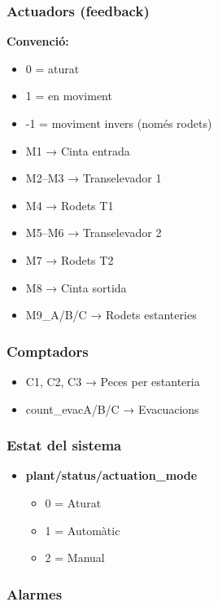 \documentclass[12pt,a4paper]{report}
\begin{document}
\subsubsection{Actuadors (feedback)}

\textbf{Convenció:}
\begin{itemize}
\item 0 = aturat
\item 1 = en moviment
\item -1 = moviment invers (només rodets)
\end{itemize}

\begin{itemize}
\item M1 → Cinta entrada
\item M2–M3 → Transelevador 1
\item M4 → Rodets T1
\item M5–M6 → Transelevador 2
\item M7 → Rodets T2
\item M8 → Cinta sortida
\item M9\_A/B/C → Rodets estanteries
\end{itemize}

\subsubsection{Comptadors}

\begin{itemize}
\item C1, C2, C3 → Peces per estanteria
\item count\_evacA/B/C → Evacuacions
\end{itemize}

\subsubsection{Estat del sistema}

\begin{itemize}
\item \textbf{plant/status/actuation\_mode}
\begin{itemize}
\item 0 = Aturat
\item 1 = Automàtic
\item 2 = Manual
\end{itemize}
\end{itemize}

\subsubsection{Alarmes}
\end{document}

